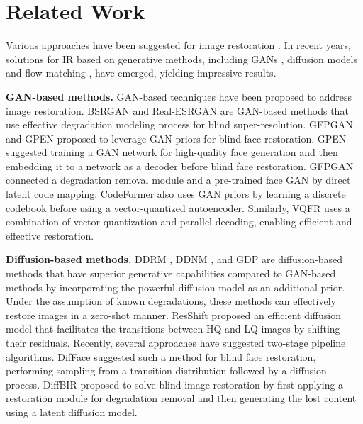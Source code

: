 \section{Related Work}
 
Various approaches have been suggested for image restoration \cite{zhang2018learning,zhang2021designing,luo2020unfolding,liang2021swinir,zhou2022codeformer,lin2023diffbir,yue2024difface,zhu2024flowie,ohayon2024posterior}. In recent years, solutions for IR based on generative methods, including GANs \cite{goodfellow2014generative}, diffusion models \cite{song2021denoising} and flow matching \cite{lipman2023flow}, have emerged, yielding impressive results.

\textbf{GAN-based methods.} GAN-based techniques have been proposed to address image restoration. BSRGAN \cite{zhang2021designing} and Real-ESRGAN \cite{wang2021realesrgan} are GAN-based methods that use effective degradation modeling process for blind super-resolution. GFPGAN \cite{wang2021gfpgan} and GPEN \cite{yang2021gan} proposed to leverage GAN priors for blind face restoration. GPEN suggested training a GAN network for high-quality face generation and then embedding it to a network as a decoder before blind face restoration. GFPGAN connected a degradation removal module and a pre-trained face GAN by direct latent code mapping. CodeFormer \cite{zhou2022codeformer} also uses GAN priors by learning a discrete codebook before using a vector-quantized autoencoder.
Similarly, VQFR \cite{gu2022vqfr} uses a combination of vector quantization and parallel decoding, enabling efficient and effective restoration.
 

\textbf{Diffusion-based methods.}
DDRM \cite{kawar2022denoising}, DDNM \cite{wangzero}, and GDP \cite{fei2023generative} are diffusion-based methods that have superior generative capabilities compared to GAN-based methods by incorporating the powerful diffusion model as an additional prior. 
Under the assumption of known degradations, these methods can effectively restore images in a zero-shot manner. ResShift \cite{10681246} proposed an efficient diffusion model that facilitates the transitions between HQ and LQ images by shifting their residuals. 
Recently, several approaches have suggested two-stage pipeline algorithms. DifFace \cite{yue2024difface} suggested such a method for blind face restoration,  performing sampling from a transition distribution followed by a diffusion process. DiffBIR \cite{lin2023diffbir} proposed to solve blind image restoration by first applying a restoration module for degradation removal and then generating the lost content using a latent diffusion model.


